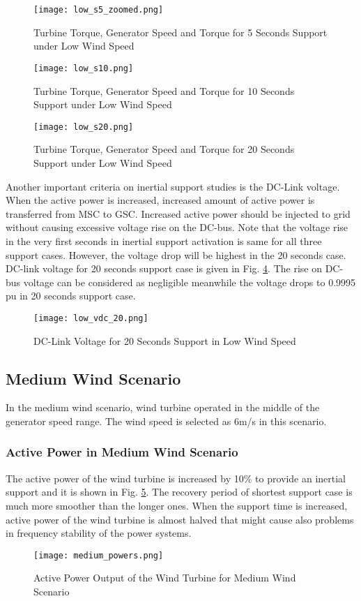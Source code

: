 \begin{figure}[h!]
	\centering
	\texttt{[image: low\_s5\_zoomed.png]}
	\caption{Turbine Torque, Generator Speed and Torque for 5 Seconds Support under Low Wind Speed}
	\label{low_torques}
\end{figure}
\begin{figure}[h!]
	\centering
	\texttt{[image: low\_s10.png]}
	\caption{Turbine Torque, Generator Speed and Torque for 10 Seconds Support under Low Wind Speed}
	\label{low_torques2}
\end{figure}
\begin{figure}[h!]
	\centering
	\texttt{[image: low\_s20.png]}
	\caption{Turbine Torque, Generator Speed and Torque for 20 Seconds Support under Low Wind Speed}
	\label{low_torques3}
\end{figure}
Another important criteria on inertial support studies is the DC-Link voltage. When the active power is increased, increased amount of active power is transferred from MSC to GSC. Increased active power should be injected to grid without causing excessive voltage rise on the DC-bus. Note that the voltage rise in the very first seconds in inertial support activation is same for all three support cases. However, the voltage drop will be highest in the 20 seconds case. DC-link voltage for 20 seconds support case is given in Fig. \ref{low_vdc_s20}. The rise on DC-bus voltage can be considered as negligible meanwhile the voltage drops to 0.9995 pu in 20 seconds support case.
\begin{figure}[h!]
	\centering
	\texttt{[image: low\_vdc\_20.png]}
	\caption{DC-Link Voltage for 20 Seconds Support in Low Wind Speed}
	\label{low_vdc_s20}
\end{figure}
\subsection{Medium Wind Scenario}
In the medium wind scenario, wind turbine operated in the middle of the generator speed range. The wind speed is selected as 6m/s in this scenario. 
\subsubsection{Active Power in Medium Wind Scenario}
The active power of the wind turbine is increased by 10\% to provide an inertial support and it is shown in Fig. \ref{midpowers}. The recovery period of shortest support case is much more smoother than the longer ones. When the support time is increased, active power of the wind turbine is almost halved that might cause also problems in frequency stability of the power systems.
\begin{figure}[h!]
	\centering
	\texttt{[image: medium\_powers.png]}
	\caption{Active Power Output of the Wind Turbine for Medium Wind Scenario}
	\label{midpowers}
\end{figure}
